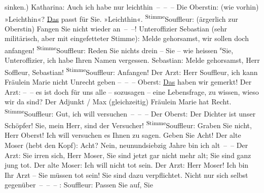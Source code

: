 					sinken.)\pend
           \pstart
           Katharina: Auch ich habe nur leichthin – – –\pend
           \pstart
           Die Oberstin: (wie vorhin) »Leichthin«? \uline{Das} passt
					für Sie. »Leichthin«.\pend
           \pstart
           \substVorne{}\textsuperscript{Stimme}{\allowbreak}\substDazwischen{}Souffleur\substHinten{}: (ärgerlich zur Oberstin) Fangen Sie nicht wieder an – –!\pend
           \pstart
           Unteroffizier Sebastian (sehr militärisch, aber mit eingefetteter Stimme): Melde
					gehorsamst, wir sollen doch anfangen!\pend
           \pstart
           \substVorne{}\textsuperscript{Stimme}{\allowbreak}\substDazwischen{}Souffleur\substHinten{}: Reden Sie nichts drein – Sie – wie heissen \substVorne{}\textsuperscript{s}\substDazwischen{}S\substHinten{}ie, Unteroffizier, ich habe Ihren Namen vergessen.\pend
           \pstart
           {\pb}Sebastian: Melde gehorsamst,
					Herr Soffleur, Sebastian!\pend
           \pstart
           \substVorne{}\textsuperscript{Stimme}{\allowbreak}\substDazwischen{}Souffleur\substHinten{}: Anfangen!\pend
           \pstart
           Der Arzt: Herr Souffleur, ich kann Fräulein Marie nicht Unrecht geben
					– – –\pend
           \pstart
           Oberst: \uline{Das} haben wir gemerkt!\pend
           \pstart
           Der Arzt: – – es ist doch für uns alle – sozusagen – eine Lebensfrage, zu
					wissen, wieso wir da sind?\pend
           \pstart
           Der Adjunkt / Max (gleichzeitig) Fräulein Marie hat Recht.\pend
           \pstart
           \substVorne{}\textsuperscript{Stimme}{\allowbreak}\substDazwischen{}Souffleur\substHinten{}: Gut, ich will versuchen – – –\pend
           \pstart
           Der Oberst: Der Dichter ist unser Schöpfer! Sie, mein Herr, sind der
					Versucher!\pend
           \pstart
           \substVorne{}\textsuperscript{Stimme}{\allowbreak}\substDazwischen{}Souffleur\substHinten{}: Graben Sie nicht, Herr Oberst! Ich will versuchen es Ihnen zu sagen.
					Geben Sie Acht!\pend
           \pstart
           Der alte Moser (hebt den Kopf): Acht? Nein, neunundsiebzig Jahre bin ich
					alt – –\pend
           \pstart
           Der Arzt: Sie irren sich, Herr Moser, Sie sind jetzt gar nicht mehr alt; Sie sind
					ganz jung tot.\pend
           \pstart
           Der alte Moser: Ich will nicht tot sein.\pend
           \pstart
           Der Arzt: Herr Moser! Ich bin Ihr Arzt – Sie müssen tot sein! Sie sind dazu
					verpflichtet. Nicht nur sich selbst gegenüber – – –\pend
           \pstart
           \introOben{}: \introOben{}Souffleur: Passen Sie auf, Sie
